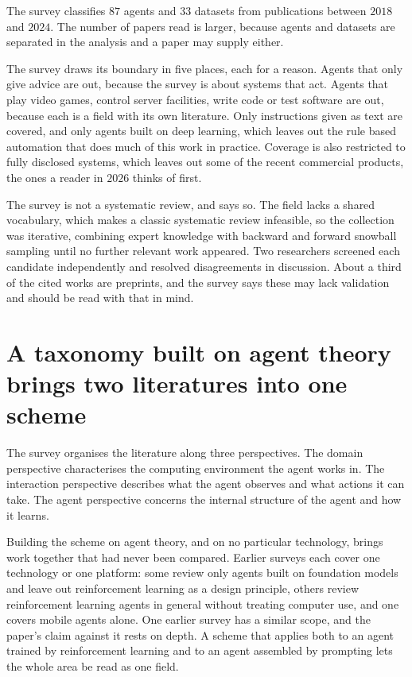 The survey classifies $87$ agents and $33$ datasets from publications between
$2018$ and $2024$. The number of papers read is larger, because agents and
datasets are separated in the analysis and a paper may supply either.

The survey draws its boundary in five places, each for a reason. Agents that only give
advice are out, because the survey is about systems that act. Agents that play
video games, control server facilities, write code or test software are out,
because each is a field with its own literature. Only instructions given as
text are covered, and only agents built on deep learning, which leaves out the
rule based automation that does much of this work in practice. Coverage is
also restricted to fully disclosed systems, which leaves out some of the
recent commercial products, the ones a reader in $2026$ thinks of first.

The survey is not a systematic review, and says so. The field lacks a shared
vocabulary, which makes a classic systematic review infeasible, so the
collection was iterative, combining expert knowledge with backward and forward
snowball sampling until no further relevant work appeared. Two researchers
screened each candidate independently and resolved disagreements in
discussion. About a third of the cited works are preprints, and the survey
says these may lack validation and should be read with that in mind.

\section{A taxonomy built on agent theory brings two literatures into one scheme}
\label{sec:acu_taxonomy}

The survey organises the literature along three perspectives. The domain
perspective characterises the computing environment the agent works in. The
interaction perspective describes what the agent observes and what actions it
can take. The agent perspective concerns the internal structure of the agent
and how it learns.

Building the scheme on agent theory, and on no particular technology, brings
work together that had never been compared. Earlier surveys each cover one
technology or one platform: some review only agents built on foundation models
and leave out reinforcement learning as a design principle, others review
reinforcement learning agents in general without treating computer use, and
one covers mobile agents alone. One earlier survey has a similar scope, and
the paper's claim against it rests on depth. A scheme that applies both to an
agent trained by reinforcement learning and to an agent assembled by prompting
lets the whole area be read as one field.

